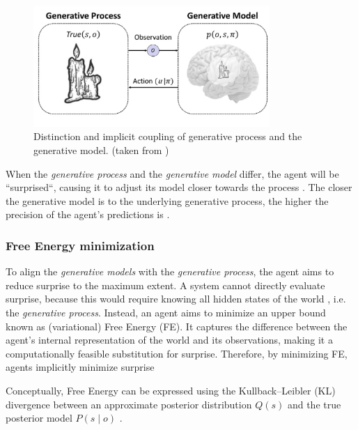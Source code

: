 \begin{figure}[htbp]
    \centering
    \includegraphics[width=0.8\textwidth]{img/generative-model-generative-process.png}
    \caption{Distinction and implicit coupling of generative process and the generative model. (taken from \cite{smith_step-by-step_2022})}
    \label{fig:generative-process-generative-model}
\end{figure}

When the \textit{generative process} and the \textit{generative model} differ, the agent will be ``surprised``, causing it to adjust its model closer towards the process \cite{bruineberg_free-energy_2018}. The closer the generative model is to the underlying generative process, the higher the precision of the agent's predictions is \cite{sedlak_active_2024}.

\subsubsection{Free Energy minimization}
To align the \textit{generative models} with the \textit{generative process}, the agent aims to reduce surprise to the maximum extent. A system cannot directly evaluate surprise, because this would require knowing all hidden states of the world \cite{friston_free-energy_2009}, i.e. the \textit{generative process}. Instead, an agent aims to minimize an upper bound \cite{smith_step-by-step_2022} known as (variational) Free Energy (FE). It captures the difference between the agent's internal representation of the world and its observations, making it a computationally feasible substitution for surprise. Therefore, by minimizing FE, agents implicitly minimize surprise \cite{friston_free-energy_2010}

Conceptually, Free Energy can be expressed using the Kullback–Leibler (KL) divergence between an approximate posterior distribution \(Q(s)\) and the true posterior model \(P( s \mid o)\) \cite{parr_active_2022,sajid_active_2021}.


